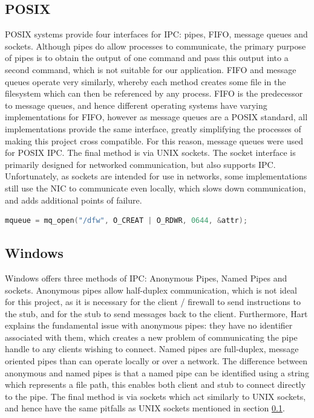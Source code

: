 \documentclass[a4paper, 11pt]{report}
\begin{document}
\subsection{POSIX} \label{posixipc}
\acrshort{POSIX} systems provide four interfaces for \acrshort{IPC}: pipes, FIFO, message queues and sockets. Although pipes do allow processes to communicate, the primary purpose of pipes is to obtain the output of one command and pass this output into a second command, which is not suitable for our application. FIFO and message queues operate very similarly, whereby each method creates some file in the filesystem which can then be referenced by any process. FIFO is the predecessor to message queues, and hence different operating systems have varying implementations for FIFO, however as message queues are a \acrshort{POSIX} standard, all implementations provide the same interface, greatly simplifying the processes of making this project cross compatible. For this reason, message queues were used for \acrshort{POSIX} \acrshort{IPC}. The final method is via UNIX sockets. The socket interface is primarily designed for networked communication, but also supports \acrshort{IPC}. Unfortunately, as sockets are intended for use in networks, some implementations still use the \acrshort{NIC} to communicate even locally, which slows down communication, and adds additional points of failure.

\begin{lstlisting}[language=c,style=c,caption=Creating the message queue on a POSIX OS]
mqueue = mq_open("/dfw", O_CREAT | O_RDWR, 0644, &attr);
\end{lstlisting}

\subsection{Windows}
Windows\cite{windows} offers three methods of \acrshort{IPC}: Anonymous Pipes, Named Pipes and sockets. Anonymous pipes allow half-duplex communication, which is not ideal for this project, as it is necessary for the client / firewall to send instructions to the \gls{stub}, and for the \gls{stub} to send messages back to the client. Furthermore, Hart\cite{windowsprog} explains the fundamental issue with anonymous pipes: they have no identifier associated with them, which creates a new problem of communicating the pipe handle to any clients wishing to connect. Named pipes are full-duplex, message oriented pipes than can operate locally or over a network. The difference between anonymous and named pipes is that a named pipe can be identified using a string which represents a file path, this enables both client and \gls{stub} to connect directly to the pipe. The final method is via sockets which act similarly to UNIX sockets, and hence have the same pitfalls as UNIX sockets mentioned in section \ref{posixipc}.\\
\end{document}
